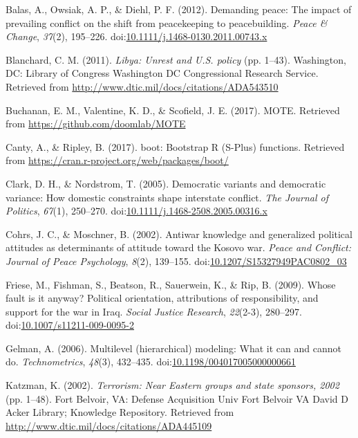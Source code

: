 \documentclass[english,,man,floatsintext]{apa6}
\begin{document}
\leavevmode\hypertarget{ref-Balas2012}{}%
Balas, A., Owsiak, A. P., \& Diehl, P. F. (2012). Demanding peace: The impact of prevailing conflict on the shift from peacekeeping to peacebuilding. \emph{Peace \& Change}, \emph{37}(2), 195--226. doi:\href{https://doi.org/10.1111/j.1468-0130.2011.00743.x}{10.1111/j.1468-0130.2011.00743.x}

\leavevmode\hypertarget{ref-Blanchard2011}{}%
Blanchard, C. M. (2011). \emph{Libya: Unrest and U.S. policy} (pp. 1--43). Washington, DC: Library of Congress Washington DC Congressional Research Service. Retrieved from \url{http://www.dtic.mil/docs/citations/ADA543510}

\leavevmode\hypertarget{ref-Buchanan2017}{}%
Buchanan, E. M., Valentine, K. D., \& Scofield, J. E. (2017). MOTE. Retrieved from \url{https://github.com/doomlab/MOTE}

\leavevmode\hypertarget{ref-Canty2017}{}%
Canty, A., \& Ripley, B. (2017). boot: Bootstrap R (S-Plus) functions. Retrieved from \url{https://cran.r-project.org/web/packages/boot/}

\leavevmode\hypertarget{ref-Clark2005}{}%
Clark, D. H., \& Nordstrom, T. (2005). Democratic variants and democratic variance: How domestic constraints shape interstate conflict. \emph{The Journal of Politics}, \emph{67}(1), 250--270. doi:\href{https://doi.org/10.1111/j.1468-2508.2005.00316.x}{10.1111/j.1468-2508.2005.00316.x}

\leavevmode\hypertarget{ref-Cohrs2002}{}%
Cohrs, J. C., \& Moschner, B. (2002). Antiwar knowledge and generalized political attitudes as determinants of attitude toward the Kosovo war. \emph{Peace and Conflict: Journal of Peace Psychology}, \emph{8}(2), 139--155. doi:\href{https://doi.org/10.1207/S15327949PAC0802_03}{10.1207/S15327949PAC0802\_03}

\leavevmode\hypertarget{ref-Friese2009}{}%
Friese, M., Fishman, S., Beatson, R., Sauerwein, K., \& Rip, B. (2009). Whose fault is it anyway? Political orientation, attributions of responsibility, and support for the war in Iraq. \emph{Social Justice Research}, \emph{22}(2-3), 280--297. doi:\href{https://doi.org/10.1007/s11211-009-0095-2}{10.1007/s11211-009-0095-2}

\leavevmode\hypertarget{ref-Gelman2006}{}%
Gelman, A. (2006). Multilevel (hierarchical) modeling: What it can and cannot do. \emph{Technometrics}, \emph{48}(3), 432--435. doi:\href{https://doi.org/10.1198/004017005000000661}{10.1198/004017005000000661}

\leavevmode\hypertarget{ref-Katzman2002}{}%
Katzman, K. (2002). \emph{Terrorism: Near Eastern groups and state sponsors, 2002} (pp. 1--48). Fort Belvoir, VA: Defense Acquisition Univ Fort Belvoir VA David D Acker Library; Knowledge Repository. Retrieved from \url{http://www.dtic.mil/docs/citations/ADA445109}
\end{document}
